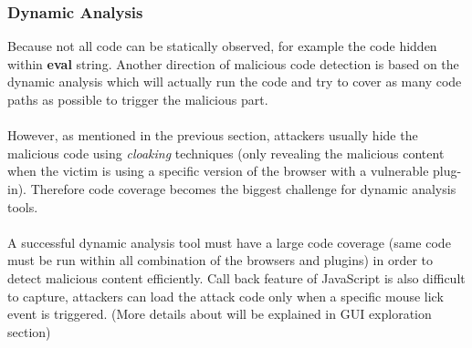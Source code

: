 \documentclass[11pt]{article}
\begin{document}
\subsubsection{Dynamic Analysis}
Because not all code can be statically observed, for example the code hidden within \textbf{eval} string. Another direction of malicious code detection is based on the dynamic analysis which will actually run the code and try to cover as many code paths as possible to trigger the malicious part. \\ \\
However, as mentioned in the previous section, attackers usually hide the malicious code using \textit{cloaking}\cite{Cloaking} techniques (only revealing the malicious content when the victim is using a specific version of the browser with a vulnerable plug-in). Therefore code coverage becomes the biggest challenge for dynamic analysis tools. \\ \\
A successful dynamic analysis tool must have a large code coverage (same code must be run within all combination of the browsers and plugins) in order to detect malicious content efficiently. Call back feature of JavaScript is also difficult to capture, attackers can load the attack code only when a specific mouse lick event is triggered. (More details about will be explained in GUI exploration section)	 
\end{document}
